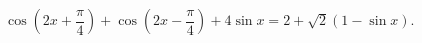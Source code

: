\begin{ex}[type=equation]
	\begin{condition}
		$\ \cos{\left(2x + \dfrac{\pi}{4}\right)} + \cos{\left(2x -\dfrac{\pi}{4}\right)} + 4\sin x = 2 +\sqrt{2}(1 -\sin x). $
	\end{condition}
\end{ex}